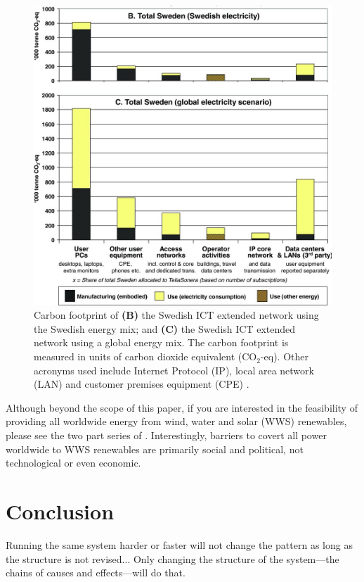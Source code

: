 \documentclass{article}
\begin{document}
\begin{figure}[h]
    \includegraphics[width=.76 \textwidth]{./images/usage_sweden_global_mix.jpeg}
    \centering
    \caption{Carbon footprint of \textbf{(B)} the Swedish ICT extended network using the Swedish energy mix; and \textbf{(C)} the Swedish ICT extended network using a global energy mix. The carbon footprint is measured in units of carbon dioxide equivalent (CO$_2$-eq). Other acronyms used include Internet Protocol (IP), local area network (LAN) and customer premises equipment (CPE) \cite{malmodin2014life}.}
    \label{usage_sweden_global_mix}
\end{figure}

Although beyond the scope of this paper, if you are interested in the feasibility of providing all worldwide energy from wind, water and solar (WWS) renewables, please see the two part series of \cite{jacobson2011providing, delucchi2011providing}. Interestingly, barriers to covert all power worldwide to WWS renewables are primarily social and political, not technological or even economic.


\cleardoublepage
\section{Conclusion} \label{SECTION_DISCUSSION}
 \begin{fquote} 
 Running the same system harder or faster will not change the pattern as long as the structure is not revised... Only changing the structure of the system—the chains of causes and effects—will do that.
 \end{fquote}
\end{document}
